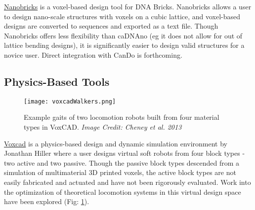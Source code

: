 {\href{http://yin.hms.harvard.edu/bricks/try/}{Nanobricks} is a voxel-based design tool for DNA Bricks.  Nanobricks allows a user to design nano-scale structures with voxels on a cubic lattice, and voxel-based designs are converted to sequences and exported as a text file.  Though Nanobricks offers less flexibility than caDNAno (eg it does not allow for out of lattice bending designs), it is significantly easier to design valid structures for a novice user.  Direct integration with CanDo is forthcoming.
\\

\subsection{Physics-Based Tools}

\begin{figure}
  \texttt{[image: voxcadWalkers.png]}
  \caption{Example gaits of two locomotion robots built from four material types in VoxCAD\cite{Cheney2013b}.  \textit{Image Credit: Cheney et al. 2013}}
  \label{fig:voxcadWalkers}
\end{figure}

\href{http://www.voxcad.com/}{Voxcad} is a physics-based design and dynamic simulation environment by Jonathan Hiller where a user designs virtual soft robots from four block types - two active and two passive\cite{Hiller2014a}.  Though the passive block types descended from a simulation of multimaterial 3D printed voxels, the active block types are not easily fabricated and actuated\cite{Hiller2012} and have not been rigorously evaluated.  Work into the optimization of theoretical locomotion systems in this virtual design space have been explored (Fig: \ref{fig:voxcadWalkers})\cite{Cheney2013b}\cite{Cheney2013}\cite{Cheney2015}.
\\

}
